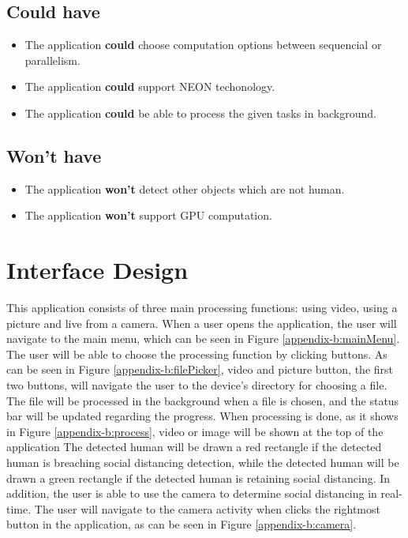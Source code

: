        \subsection{Could have}
            \begin{itemize}
                \item The application \textbf{could} choose computation options between sequencial or parallelism.
                \item The application \textbf{could} support NEON techonology.
                \item The application \textbf{could} be able to process the given tasks in background.
            \end{itemize}
        \subsection{Won't have}
            \begin{itemize}
                \item The application \textbf{won't} detect other objects which are not human.
                \item The application \textbf{won't} support GPU computation.
            \end{itemize}

    \section{Interface Design}
        This application consists of three main processing functions: using video, using a picture and live from a camera.
        When a user opens the application, the user will navigate to the main menu, which can be seen in Figure \ref{appendix-b:mainMenu}.
        The user will be able to choose the processing function by clicking buttons.
        As can be seen in Figure \ref{appendix-b:filePicker}, video and picture button, the first two buttons, will navigate the user to the device's directory for choosing a file.
        The file will be processed in the background when a file is chosen, and the status bar will be updated regarding the progress.
        When processing is done, as it shows in Figure \ref{appendix-b:process}, video or image will be shown at the top of the application
        The detected human will be drawn a red rectangle if the detected human is breaching social distancing detection,
        while the detected human will be drawn a green rectangle if the detected human is retaining social distancing.
        In addition, the user is able to use the camera to determine social distancing in real-time.
        The user will navigate to the camera activity when clicks the rightmost button in the application, as can be seen in Figure \ref{appendix-b:camera}.

